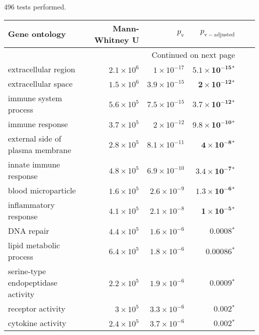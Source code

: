 \documentclass{article}
\begin{document}
496 tests performed.\scriptsize
\begin{longtable}{|l|r|r|r|r|r|}
\toprule
                                     Gene ontology &     Mann-Whitney U &     $p_{\mathrm{v}}$ &      $p_{\mathrm{v-adjusted}}$ \\
\midrule
\endhead
\midrule
\multicolumn{4}{r}{{Continued on next page}} \\
\midrule
\endfoot

\bottomrule
\endlastfoot
                              extracellular region & $2.1\times 10^{6}$ &  $ 1\times 10^{-17}$ &  $\bm{5.1\times 10^{-15}{^*}}$ \\
                               extracellular space & $1.5\times 10^{6}$ & $3.9\times 10^{-15}$ &   $\bm{ 2\times 10^{-12}{^*}}$ \\
                             immune system process & $5.6\times 10^{5}$ & $7.5\times 10^{-15}$ &  $\bm{3.7\times 10^{-12}{^*}}$ \\
                                   immune response & $3.7\times 10^{5}$ &  $ 2\times 10^{-12}$ &  $\bm{9.8\times 10^{-10}{^*}}$ \\
                  external side of plasma membrane & $2.8\times 10^{5}$ & $8.1\times 10^{-11}$ &    $\bm{ 4\times 10^{-8}{^*}}$ \\
                            innate immune response & $4.8\times 10^{5}$ & $6.9\times 10^{-10}$ &   $\bm{3.4\times 10^{-7}{^*}}$ \\
                               blood microparticle & $1.6\times 10^{5}$ &  $2.6\times 10^{-9}$ &   $\bm{1.3\times 10^{-6}{^*}}$ \\
                             inflammatory response & $4.1\times 10^{5}$ &  $2.1\times 10^{-8}$ &    $\bm{ 1\times 10^{-5}{^*}}$ \\
                                        DNA repair & $4.4\times 10^{5}$ &  $1.6\times 10^{-6}$ &              $\bm{0.0008{^*}}$ \\
                           lipid metabolic process & $6.4\times 10^{5}$ &  $1.8\times 10^{-6}$ &             $\bm{0.00086{^*}}$ \\
                serine-type endopeptidase activity & $2.2\times 10^{5}$ &  $1.9\times 10^{-6}$ &              $\bm{0.0009{^*}}$ \\
                                 receptor activity &  $ 3\times 10^{5}$ &  $3.3\times 10^{-6}$ &              $\bm{ 0.002{^*}}$ \\
                                 cytokine activity & $2.4\times 10^{5}$ &  $3.7\times 10^{-6}$ &              $\bm{ 0.002{^*}}$ \\

\end{longtable}
\end{document}
